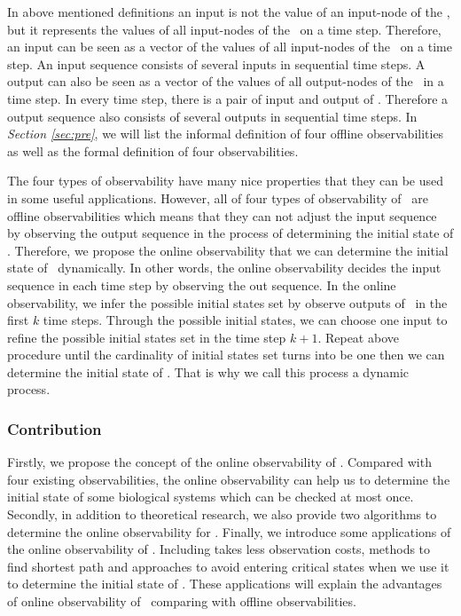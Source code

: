 
In above mentioned definitions an input is not the value of an input-node of the \BCN, but it represents the values of all input-nodes of the \BCN\ on a time step. Therefore, an input can be seen as a vector of the values of all input-nodes of the \BCN\ on a time step. An input sequence consists of several inputs in sequential time steps.
     A output can also be seen as a vector of the values of all output-nodes of the \BCN\ in a time step. In every time step, there is a pair of input and output of \BCN. Therefore a output sequence also consists of several outputs in sequential time steps. In {\em Section \ref{sec:pre}}, we will list the informal definition of four offline  observabilities as well as the formal definition of four observabilities.%
 
The four  types of observability  have many nice properties that they can be used in some useful applications. However, all of four  types of observability of \BCNs\ are offline observabilities which means that they can not adjust the input sequence by observing the output sequence in the process of determining the initial state of \BCNs. Therefore, we propose the online observability that we can determine the initial state of \BCNs\ dynamically. In other words,  the online observability decides the input sequence in each time step by observing the out sequence. In the  online observability, we infer the possible  initial states set by observe outputs of \BCN\ in the first $k$ time steps. Through the  possible  initial states, we can choose one input to refine the possible initial states set in the time step $k+1$. Repeat above procedure until the cardinality of initial states set turns into be one then we can determine the initial state of \BCNs. That is why we call this process a dynamic process. 

\subsubsection*{Contribution}
Firstly, we propose the concept of the online observability of \BCNs. Compared with four existing observabilities, the online observability can help us to determine the initial state of some biological systems which can be checked at most once. Secondly, in addition to theoretical research, we also provide two algorithms to determine the online observability for \BCNs. Finally, we introduce some applications of the online observability of \BCNs. Including takes less observation costs, methods to find shortest path and approaches to avoid entering critical states when we use it to determine the initial state of \BCNs.  These applications will explain the advantages of online observability of \BCNs\ comparing with offline observabilities. %
